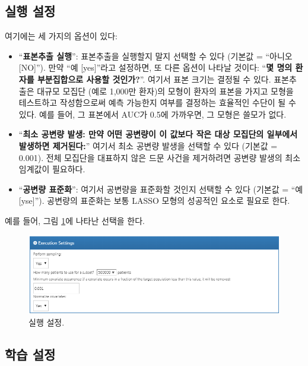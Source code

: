 \documentclass[11pt]{book}
\providecommand{\tightlist}{%
  \setlength{\itemsep}{0pt}\setlength{\parskip}{0pt}}
\theoremstyle{definition}
\theoremstyle{definition}
\theoremstyle{definition}
\theoremstyle{remark}
\begin{document}
\subsection{실행 설정}\label{-}

여기에는 세 가지의 옵션이 있다:

\begin{itemize}
\tightlist
\item
  ``\textbf{표본추출 실행}'': 표본추출을 실행할지 말지 선택할 수 있다
  (기본값 = ``아니오 {[}NO{]}''). 만약 ``예 {[}yes{]}''라고 설정하면, 또
  다른 옵션이 나타날 것이다: ``\textbf{몇 명의 환자를 부분집합으로
  사용할 것인가?}''. 여기서 표본 크기는 결정될 수 있다. 표본추출은
  대규모 모집단 (예로 1,000만 환자)의 모형이 환자의 표본을 가지고 모형을
  테스트하고 작성함으로써 예측 가능한지 여부를 결정하는 효율적인 수단이
  될 수 있다. 예를 들어, 그 표본에서 AUC가 0.5에 가까우면, 그 모형은
  쓸모가 없다.
\item
  ``\textbf{최소 공변량 발생: 만약 어떤 공변량이 이 값보다 작은 대상
  모집단의 일부에서 발생하면 제거된다:}'' 여기서 최소 공변량 발생을
  선택할 수 있다 (기본값 = 0.001). 전체 모집단을 대표하지 않은 드문
  사건을 제거하려면 공변량 발생의 최소 임계값이 필요하다.
\item
  ``\textbf{공변량 표준화}'': 여기서 공변량을 표준화할 것인지 선택할 수
  있다 (기본값 = ``예 {[}yse{]}''). 공변량의 표준화는 보통 LASSO 모형의
  성공적인 요소로 필요로 한다.
\end{itemize}

예를 들어, 그림 \ref{fig:executionSettings}에 나타난 선택을 한다.

\begin{figure}

{\centering \includegraphics[width=1\linewidth]{images/PatientLevelPrediction/executionSettings} 

}

\caption{실행 설정.}\label{fig:executionSettings}
\end{figure}

\subsection{학습 설정}\label{-}
\end{document}
